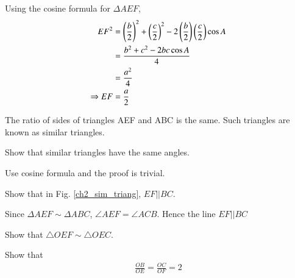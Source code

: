 \proof Using the cosine formula for $\Delta AEF$,
%
\begin{align}
EF^2 &= \left(\frac{b}{2}\right)^2 + \left(\frac{c}{2}\right)^2 - 2 \left(\frac{b}{2}\right)\left(\frac{c}{2}\right) \cos A \\
&= \frac{b^2 + c^2 - 2bc \cos A}{4} \\
&= \frac{a^2}{4} \\
\Rightarrow EF &= \frac{a}{2}
\end{align}
%

\begin{definition}
	The ratio of sides of triangles AEF and ABC is the same.  Such triangles are known as similar triangles.
\end{definition}
\begin{problem}
	Show that similar triangles have the same angles.
\end{problem}
\proof Use cosine formula and the proof is trivial.
\begin{problem}
	Show that in Fig. \ref{ch2_sim_triang}, $EF || BC$.
\end{problem}
\proof Since $\Delta AEF \sim \Delta ABC$, $\angle AEF = \angle ACB$.  Hence the line $EF||BC$
%
\begin{problem}
	Show that $\triangle OEF \sim \triangle OEC$.
\end{problem}
\begin{problem}
Show that
	\begin{align}
	\frac{OB}{OE} = \frac{OC}{OF} = 2
	\end{align}
\end{problem}
%

%
%		
%

